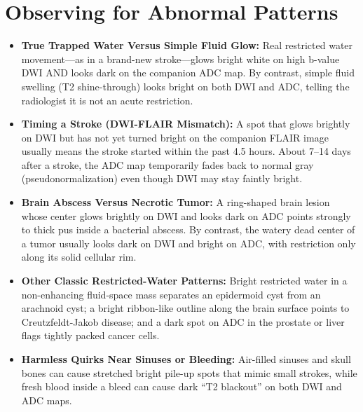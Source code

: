 \section{Observing for Abnormal Patterns}
\begin{itemize}
\item \textbf{True Trapped Water Versus Simple Fluid Glow:} Real restricted water movement---as in a brand-new stroke---glows bright white on high b-value DWI AND looks dark on the companion ADC map. By contrast, simple fluid swelling (T2 shine-through) looks bright on both DWI and ADC, telling the radiologist it is not an acute restriction.
\item \textbf{Timing a Stroke (DWI-FLAIR Mismatch):} A spot that glows brightly on DWI but has not yet turned bright on the companion FLAIR image usually means the stroke started within the past 4.5 hours. About 7--14 days after a stroke, the ADC map temporarily fades back to normal gray (pseudonormalization) even though DWI may stay faintly bright.
\item \textbf{Brain Abscess Versus Necrotic Tumor:} A ring-shaped brain lesion whose center glows brightly on DWI and looks dark on ADC points strongly to thick pus inside a bacterial abscess. By contrast, the watery dead center of a tumor usually looks dark on DWI and bright on ADC, with restriction only along its solid cellular rim.
\item \textbf{Other Classic Restricted-Water Patterns:} Bright restricted water in a non-enhancing fluid-space mass separates an epidermoid cyst from an arachnoid cyst; a bright ribbon-like outline along the brain surface points to Creutzfeldt-Jakob disease; and a dark spot on ADC in the prostate or liver flags tightly packed cancer cells.
\item \textbf{Harmless Quirks Near Sinuses or Bleeding:} Air-filled sinuses and skull bones can cause stretched bright pile-up spots that mimic small strokes, while fresh blood inside a bleed can cause dark ``T2 blackout'' on both DWI and ADC maps.
\end{itemize}

